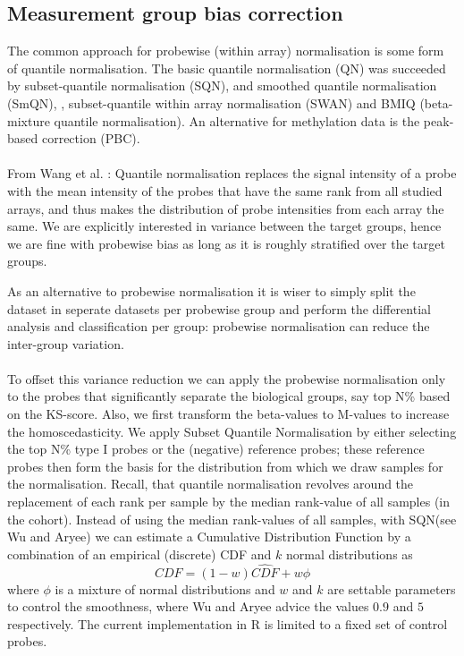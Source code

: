 \documentclass[a4paper,10pt]{article}
\begin{document}
\subsection{Measurement group bias correction}
%
The common approach for probewise (within array) normalisation is some form 
of quantile normalisation. The basic quantile normalisation (QN) 
was succeeded by subset-quantile normalisation (SQN), and smoothed quantile normalisation (SmQN),
, subset-quantile within array normalisation (SWAN) and BMIQ (beta-mixture quantile normalisation).
An alternative for methylation data is the peak-based correction (PBC). \\ \\ 
%
From Wang et al. \cite{Wang2015}: Quantile normalisation replaces the signal intensity of a probe with the mean intensity of the probes that have the same rank from all studied arrays, and thus makes the distribution of probe intensities from each array the same. We are explicitly interested in variance between the target groups, hence we are fine with probewise bias as long as it is roughly stratified over the target groups. 

As an alternative to probewise normalisation it is wiser to simply split the dataset in seperate datasets per probewise group and perform the differential analysis and classification per group: probewise normalisation can reduce the inter-group variation. \\ \\
%
To offset this variance reduction we can apply the probewise normalisation only to the probes that significantly separate the biological groups, say top N\% based on the KS-score. Also, we first transform the beta-values to M-values to increase the homoscedasticity.
We apply Subset Quantile Normalisation by either selecting the top N\% type I probes or the (negative) reference probes;
these reference probes then form the basis for the distribution from which we draw samples for the normalisation. Recall, that
quantile normalisation revolves around the replacement of each rank per sample by the median rank-value of all samples (in the cohort). Instead of using the median rank-values of all samples, with SQN(see Wu and Aryee\cite{Wu2010}) we can estimate a Cumulative Distribution Function by a combination of an empirical (discrete) CDF and $k$ normal distributions as
%
\begin{equation*}
 CDF = (1-w)\hat{CDF} + w\phi
\end{equation*}
%
where $\phi$ is a mixture of normal distributions and $w$ and $k$ are settable parameters to control the smoothness, where Wu and Aryee advice the values $0.9$ and $5$ respectively. 
The current implementation in R is limited to a fixed set of control probes. 
\end{document}
